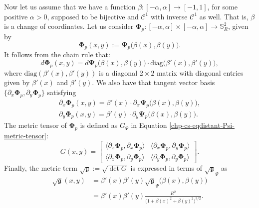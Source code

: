 Now let us assume that we have a function $\beta:[-\alpha,\alpha] \to [-1,1]$, for some positive $\alpha>0$,
supposed to be bijective and $\mathcal{C}^1$ with inverse $\mathcal{C}^1$ as well.
That is, $\beta$ is a change of coordinates.
Let us consider $ \boldsymbol{\Phi}_p: [-\alpha,\alpha]\times [-\alpha,\alpha] \to \mathbb{S}^2_R$,
given by 
\begin{equation*}
	\boldsymbol{\Phi}_p(x,y) := \boldsymbol{\Psi}_p\big(\beta(x),\beta(y)\big).
\end{equation*}
It follows from the chain rule that:
\begin{equation*}
        d \boldsymbol{\Phi}_p(x,y) = d \boldsymbol{\Psi}_p\big(\beta(x),\beta(y)\big)\cdot\text{diag}\big(\beta'(x),\beta'(y)\big),
\end{equation*}
where $\text{diag}(\beta'(x),\beta'(y))$ is a diagonal $2\times 2$ matrix with diagonal entries given by $\beta'(x)$ and $\beta'(y)$.
We also have that tangent vector basis $\{{\partial_x  \boldsymbol{\Phi}_p},  {\partial_y  \boldsymbol{\Phi}_p}\}$ satisfying
\begin{align*}
	{\partial_x  \boldsymbol{\Phi}_p}(x,y) = \beta'(x) \cdot {\partial_x  \boldsymbol{\Psi}_p}\big(\beta(x),\beta(y)\big),\\
	{\partial_y  \boldsymbol{\Phi}_p}(x,y) = \beta'(y) \cdot {\partial_y  \boldsymbol{\Psi}_p}\big(\beta(x),\beta(y)\big).
\end{align*}
The metric tensor of $\boldsymbol{\Phi}_p$ is defined as $G_{\Psi}$ in Equation \eqref{chp-cs-eqdistant-Psi-metric-tensor}:
\begin{equation*}
	\label{chp-cs-eqdistant-Phi-metric-tensor}
	G(x,y) = 
	\begin{bmatrix}
		\langle  {\partial_x  \boldsymbol{\Phi}_p}, {\partial_x \boldsymbol{\Phi}_p} \rangle & 
		\langle  {\partial_x  \boldsymbol{\Phi}_p}, {\partial_y \boldsymbol{\Phi}_p} \rangle \\
		\langle  {\partial_x  \boldsymbol{\Phi}_p}, {\partial_y \boldsymbol{\Phi}_p} \rangle  &
		\langle  {\partial_y  \boldsymbol{\Phi}_p}, {\partial_y \boldsymbol{\Phi}_p} \rangle 
	\end{bmatrix}.
\end{equation*}
Finally, the metric term $\sqrt{\mathfrak{g}}:= \sqrt{\det{G}}$ is expressed in terms of $\sqrt{\mathfrak{g}}_{\Psi}$ as
\begin{align*}
    \sqrt{\mathfrak{g}}(x,y) &= \beta'(x)\beta'(y)\sqrt{\mathfrak{g}}_{\Psi}\big(\beta(x),\beta(y)\big)\\
    &= \beta'(x)\beta'(y)\frac{R^2}{\big(1+\beta(x)^2+\beta(y)^2\big)^{3/2}}.
\end{align*}


